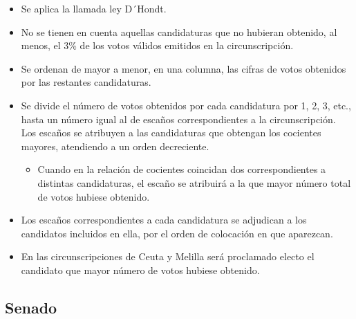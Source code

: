 \documentclass[12pt,a4paper,]{book}
\providecommand{\tightlist}{%
  \setlength{\itemsep}{0pt}\setlength{\parskip}{0pt}}
\numberwithin{dummy}{section}
\theoremstyle{ocrenumbox}
\theoremstyle{blacknumex}
\theoremstyle{blacknumbox}
\theoremstyle{ocrenum}
\theoremstyle{ocrenum}
\begin{document}
\begin{itemize}
\item
  Se aplica la llamada ley D´Hondt.
\item
  No se tienen en cuenta aquellas candidaturas que no hubieran obtenido,
  al menos, el 3\% de los votos válidos emitidos en la circunscripción.
\item
  Se ordenan de mayor a menor, en una columna, las cifras de votos
  obtenidos por las restantes candidaturas.
\item
  Se divide el número de votos obtenidos por cada candidatura por 1, 2,
  3, etc., hasta un número igual al de escaños correspondientes a la
  circunscripción. Los escaños se atribuyen a las candidaturas que
  obtengan los cocientes mayores, atendiendo a un orden decreciente.

  \begin{itemize}
  \tightlist
  \item
    Cuando en la relación de cocientes coincidan dos correspondientes a
    distintas candidaturas, el escaño se atribuirá a la que mayor número
    total de votos hubiese obtenido.
  \end{itemize}
\item
  Los escaños correspondientes a cada candidatura se adjudican a los
  candidatos incluidos en ella, por el orden de colocación en que
  aparezcan.
\item
  En las circunscripciones de Ceuta y Melilla será proclamado electo el
  candidato que mayor número de votos hubiese obtenido.
\end{itemize}

\hypertarget{senado}{%
\subsection{Senado}\label{senado}}
\end{document}
